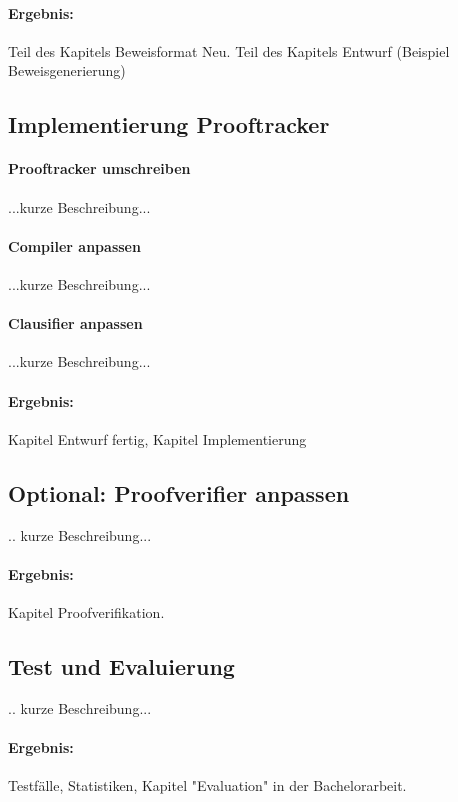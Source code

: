 \documentclass[a4paper]{article}
\begin{document}
\paragraph{Ergebnis:}
Teil des Kapitels Beweisformat Neu.
Teil des Kapitels Entwurf (Beispiel Beweisgenerierung)


\subsection{Implementierung Prooftracker}

\paragraph{Prooftracker umschreiben}

...kurze Beschreibung...
\paragraph{Compiler anpassen}

...kurze Beschreibung...
\paragraph{Clausifier anpassen}
...kurze Beschreibung...

\paragraph{Ergebnis:}
Kapitel Entwurf fertig, Kapitel Implementierung

\subsection{Optional: Proofverifier anpassen}

.. kurze Beschreibung...

\paragraph{Ergebnis:}
Kapitel Proofverifikation.

\subsection{Test und Evaluierung}

.. kurze Beschreibung...

\paragraph{Ergebnis:}
Testfälle, Statistiken,
Kapitel "Evaluation" in der Bachelorarbeit.
\end{document}
